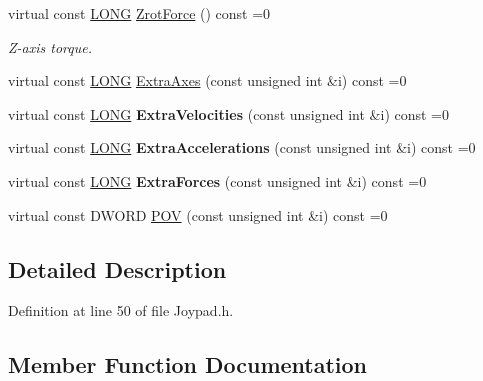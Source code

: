 \begin{DoxyCompactItemize}
virtual const \hyperlink{_joypad_8h_a2a3e0cda5f1249bef6db47c5eb8e3813}{L\+O\+NG} \hyperlink{struct_x_input_joypad_ab831c12b47291cc3d3892ed56c1f880e}{Zrot\+Force} () const =0
\begin{DoxyCompactList}\small\item\em Z-\/axis torque. \end{DoxyCompactList}\item 
virtual const \hyperlink{_joypad_8h_a2a3e0cda5f1249bef6db47c5eb8e3813}{L\+O\+NG} \hyperlink{struct_x_input_joypad_a074ad76f1e54b559fcee6606049bb6b7}{Extra\+Axes} (const unsigned int \&i) const =0
\item 
\mbox{\label{struct_x_input_joypad_aabd7d5d90730169be8278036de089e49}} 
virtual const \hyperlink{_joypad_8h_a2a3e0cda5f1249bef6db47c5eb8e3813}{L\+O\+NG} {\bfseries Extra\+Velocities} (const unsigned int \&i) const =0
\item 
\mbox{\label{struct_x_input_joypad_aa36c5b3fcfeab916dcd011e8f0e1f8bd}} 
virtual const \hyperlink{_joypad_8h_a2a3e0cda5f1249bef6db47c5eb8e3813}{L\+O\+NG} {\bfseries Extra\+Accelerations} (const unsigned int \&i) const =0
\item 
\mbox{\label{struct_x_input_joypad_aabb3c119fb0512f326036c8d0cee4bf2}} 
virtual const \hyperlink{_joypad_8h_a2a3e0cda5f1249bef6db47c5eb8e3813}{L\+O\+NG} {\bfseries Extra\+Forces} (const unsigned int \&i) const =0
\item 
virtual const D\+W\+O\+RD \hyperlink{struct_x_input_joypad_a2f270f296bcaf98089ab23f74a6e9937}{P\+OV} (const unsigned int \&i) const =0
\end{DoxyCompactItemize}


\subsection{Detailed Description}


Definition at line 50 of file Joypad.\+h.



\subsection{Member Function Documentation}
\mbox{\label{struct_x_input_joypad_a13cc187aae10747b0376cb1ed3710b5a}} 
